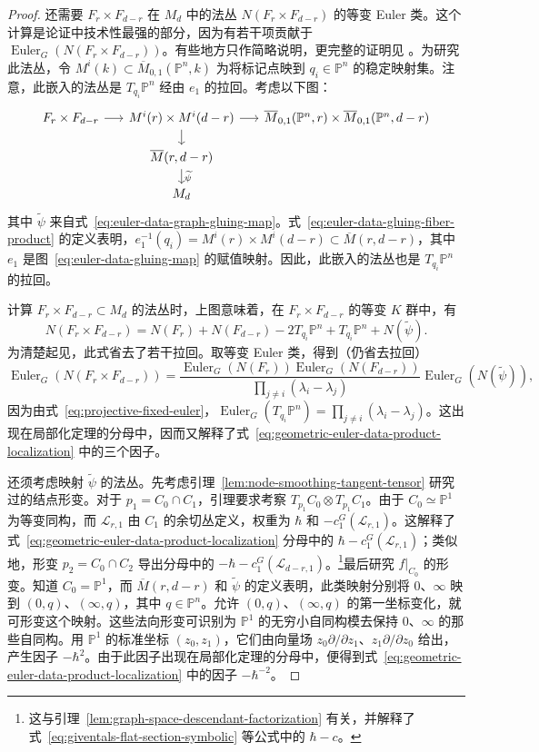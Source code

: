 \begin{proof}
还需要 $F_r\times F_{d-r}$ 在 $M_d$ 中的法丛 $N(F_r\times F_{d-r})$ 的等变 Euler 类。这个计算是论证中技术性最强的部分，因为有若干项贡献于 $\operatorname{Euler}_G(N(F_r\times F_{d-r}))$。有些地方只作简略说明，更完整的证明见 。为研究此法丛，令 $M^i(k)\subset\overline M_{0,1}(\mathbb P^n,k)$ 为将标记点映到 $q_i\in\mathbb P^n$ 的稳定映射集。注意，此嵌入的法丛是 $T_{q_i}\mathbb P^n$ 经由 $e_1$ 的拉回。考虑以下图：
\[
\begin{tikzcd}[column sep=1.5em,row sep=1.2em]
F_r\times F_{d-r}\arrow[r]&M^i(r)\times M^i(d-r)\arrow[r]\arrow[d]&
\overline M_{0,1}(\mathbb P^n,r)\times\overline M_{0,1}(\mathbb P^n,d-r)\\
&\overline M(r,d-r)\arrow[d,"\widetilde\psi"]&\\
&M_d&
\end{tikzcd}
\]
其中 $\widetilde\psi$ 来自式~\eqref{eq:euler-data-graph-gluing-map}。式~\eqref{eq:euler-data-gluing-fiber-product} 的定义表明，$e_1^{-1}(q_i)=M^i(r)\times M^i(d-r)\subset\overline M(r,d-r)$，其中 $e_1$ 是图~\eqref{eq:euler-data-gluing-map} 的赋值映射。因此，此嵌入的法丛也是 $T_{q_i}\mathbb P^n$ 的拉回。

计算 $F_r\times F_{d-r}\subset M_d$ 的法丛时，上图意味着，在 $F_r\times F_{d-r}$ 的等变 $K$ 群中，有
\[
N(F_r\times F_{d-r})=N(F_r)+N(F_{d-r})-2T_{q_i}\mathbb P^n
+T_{q_i}\mathbb P^n+N(\widetilde\psi).
\]
为清楚起见，此式省去了若干拉回。取等变 Euler 类，得到（仍省去拉回）
\[
\operatorname{Euler}_G(N(F_r\times F_{d-r}))
=\frac{\operatorname{Euler}_G(N(F_r))\operatorname{Euler}_G(N(F_{d-r}))}
{\prod_{j\ne i}(\lambda_i-\lambda_j)}\operatorname{Euler}_G(N(\widetilde\psi)),
\]
因为由式~\eqref{eq:projective-fixed-euler}，$\operatorname{Euler}_G(T_{q_i}\mathbb P^n)=\prod_{j\ne i}(\lambda_i-\lambda_j)$。这出现在局部化定理的分母中，因而又解释了式~\eqref{eq:geometric-euler-data-product-localization} 中的三个因子。

还须考虑映射 $\widetilde\psi$ 的法丛。先考虑引理~\ref{lem:node-smoothing-tangent-tensor} 研究过的结点形变。对于 $p_1=C_0\cap C_1$，引理要求考察 $T_{p_1}C_0\otimes T_{p_1}C_1$。由于 $C_0\simeq\mathbb P^1$ 为等变同构，而 $\mathcal L_{r,1}$ 由 $C_1$ 的余切丛定义，权重为 $\hbar$ 和 $-c_1^G(\mathcal L_{r,1})$。这解释了式~\eqref{eq:geometric-euler-data-product-localization} 分母中的 $\hbar-c_1^G(\mathcal L_{r,1})$；类似地，形变 $p_2=C_0\cap C_2$ 导出分母中的 $-\hbar-c_1^G(\mathcal L_{d-r,1})$。\footnote{这与引理~\ref{lem:graph-space-descendant-factorization} 有关，并解释了式~\eqref{eq:giventals-flat-section-symbolic} 等公式中的 $\hbar-c$。}最后研究 $f|_{C_0}$ 的形变。知道 $C_0=\mathbb P^1$，而 $\overline M(r,d-r)$ 和 $\widetilde\psi$ 的定义表明，此类映射分别将 $0$、$\infty$ 映到 $(0,q)$、$(\infty,q)$，其中 $q\in\mathbb P^n$。允许 $(0,q)$、$(\infty,q)$ 的第一坐标变化，就可形变这个映射。这些法向形变可识别为 $\mathbb P^1$ 的无穷小自同构模去保持 $0$、$\infty$ 的那些自同构。用 $\mathbb P^1$ 的标准坐标 $(z_0,z_1)$，它们由向量场 $z_0\partial/\partial z_1$、$z_1\partial/\partial z_0$ 给出，产生因子 $-\hbar^2$。由于此因子出现在局部化定理的分母中，便得到式~\eqref{eq:geometric-euler-data-product-localization} 中的因子 $-\hbar^{-2}$。


\end{proof}

